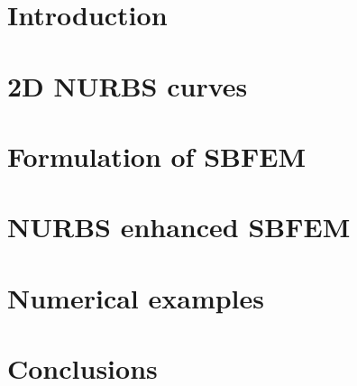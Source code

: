 
\section{Introduction}

\section{2D NURBS curves}
    
    
    
\section{Formulation of SBFEM}

\section{NURBS enhanced SBFEM}
    

\section{Numerical examples}
    
\section{Conclusions}